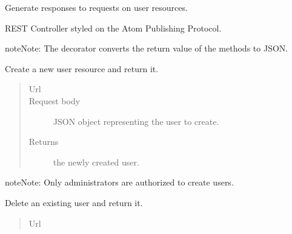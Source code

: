 \documentclass[letterpaper,10pt,english]{sphinxmanual}
\begin{document}
\begin{fulllineitems}
\label{api:onlinelinguisticdatabase.controllers.users.UsersController}
Generate responses to requests on user resources.

REST Controller styled on the Atom Publishing Protocol.

\begin{notice}{note}{Note:}
The  decorator converts the return value of the methods to
JSON.
\end{notice}

\begin{fulllineitems}
\label{api:onlinelinguisticdatabase.controllers.users.UsersController.create}
Create a new user resource and return it.
\begin{quote}\begin{description}
\item[{Url }] \leavevmode
{}

\item[{Request body}] \leavevmode
JSON object representing the user to create.

\item[{Returns}] \leavevmode
the newly created user.

\end{description}\end{quote}

\begin{notice}{note}{Note:}
Only administrators are authorized to create users.
\end{notice}

\end{fulllineitems}


\begin{fulllineitems}
\label{api:onlinelinguisticdatabase.controllers.users.UsersController.delete}
Delete an existing user and return it.
\begin{quote}\begin{description}
\item[{Url }] \leavevmode
{}


\end{description}
\end{quote}
\end{fulllineitems}
\end{fulllineitems}
\end{document}
